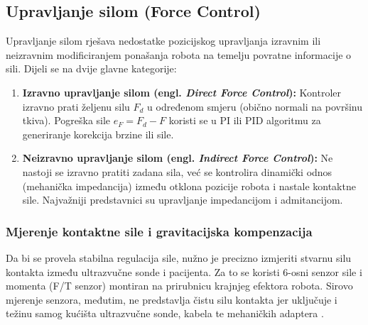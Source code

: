 \subsection{Upravljanje silom (Force Control)}
Upravljanje silom rješava nedostatke pozicijskog upravljanja izravnim ili neizravnim modificiranjem ponašanja robota na temelju povratne informacije o sili. Dijeli se na dvije glavne kategorije:
\begin{enumerate}
    \item \textbf{Izravno upravljanje silom (engl. \textit{Direct Force Control}):} Kontroler izravno prati željenu silu $F_d$ u određenom smjeru (obično normali na površinu tkiva). Pogreška sile $e_F = F_d - F$ koristi se u PI ili PID algoritmu za generiranje korekcija brzine ili sile.
    \item \textbf{Neizravno upravljanje silom (engl. \textit{Indirect Force Control}):} Ne nastoji se izravno pratiti zadana sila, već se kontrolira dinamički odnos (mehanička impedancija) između otklona pozicije robota i nastale kontaktne sile. Najvažniji predstavnici su upravljanje impedancijom i admitancijom.
\end{enumerate}

\subsubsection{Mjerenje kontaktne sile i gravitacijska kompenzacija}
Da bi se provela stabilna regulacija sile, nužno je precizno izmjeriti stvarnu silu kontakta između ultrazvučne sonde i pacijenta. Za to se koristi 6-osni senzor sile i momenta (F/T senzor) montiran na prirubnicu krajnjeg efektora robota. Sirovo mjerenje senzora, međutim, ne predstavlja čistu silu kontakta jer uključuje i težinu samog kućišta ultrazvučne sonde, kabela te mehaničkih adaptera \cite{jiang2024force}. 


